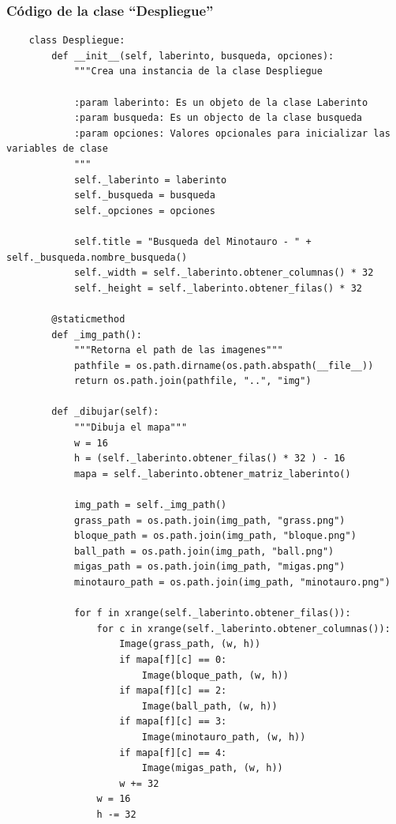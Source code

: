 \documentclass[letter, titlepage, 10pt]{article}
\begin{document}
\subsubsection{Código de la clase ``Despliegue''}
\begin{lstlisting}
    class Despliegue:
        def __init__(self, laberinto, busqueda, opciones):
            """Crea una instancia de la clase Despliegue
            
            :param laberinto: Es un objeto de la clase Laberinto
            :param busqueda: Es un objecto de la clase busqueda
            :param opciones: Valores opcionales para inicializar las variables de clase
            """
            self._laberinto = laberinto
            self._busqueda = busqueda
            self._opciones = opciones
            
            self.title = "Busqueda del Minotauro - " + self._busqueda.nombre_busqueda()
            self._width = self._laberinto.obtener_columnas() * 32
            self._height = self._laberinto.obtener_filas() * 32
    
        @staticmethod
        def _img_path():
            """Retorna el path de las imagenes"""
            pathfile = os.path.dirname(os.path.abspath(__file__))
            return os.path.join(pathfile, "..", "img")
    
        def _dibujar(self):
            """Dibuja el mapa"""
            w = 16
            h = (self._laberinto.obtener_filas() * 32 ) - 16
            mapa = self._laberinto.obtener_matriz_laberinto()
    
            img_path = self._img_path()
            grass_path = os.path.join(img_path, "grass.png")
            bloque_path = os.path.join(img_path, "bloque.png")
            ball_path = os.path.join(img_path, "ball.png")
            migas_path = os.path.join(img_path, "migas.png")
            minotauro_path = os.path.join(img_path, "minotauro.png")
    
            for f in xrange(self._laberinto.obtener_filas()):
                for c in xrange(self._laberinto.obtener_columnas()):
                    Image(grass_path, (w, h))
                    if mapa[f][c] == 0:
                        Image(bloque_path, (w, h))
                    if mapa[f][c] == 2:
                        Image(ball_path, (w, h))
                    if mapa[f][c] == 3:
                        Image(minotauro_path, (w, h))
                    if mapa[f][c] == 4:
                        Image(migas_path, (w, h))
                    w += 32
                w = 16
                h -= 32
        

\end{lstlisting}
\end{document}
